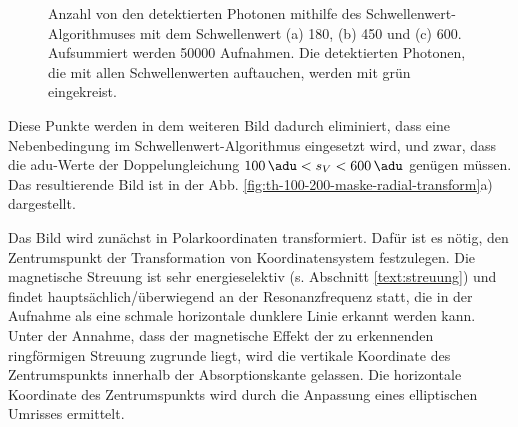 %     
\begin{figure}[H]
    \centering
    
    \caption{Anzahl von den detektierten Photonen mithilfe des Schwellenwert-Algorithmuses mit dem Schwellenwert (a) \SI{180}{\adu}, (b) \SI{450}{\adu} und (c) \SI{600}{\adu}. Aufsummiert werden \num{50000} Aufnahmen. Die detektierten Photonen, die mit allen Schwellenwerten auftauchen, werden mit grün eingekreist.}
    \label{fig:th_180_450_600}
\end{figure}
\noindent
Diese Punkte werden in dem weiteren Bild dadurch eliminiert, dass eine Nebenbedingung im Schwellenwert-Algorithmus eingesetzt wird, und zwar, dass die \gls{adu}-Werte der Doppelungleichung $\SI{100}{\adu} < s_V < \SI{600}{\adu}$ genügen müssen. Das resultierende Bild ist in der Abb. \ref{fig:th-100-200-maske-radial-transform}a) dargestellt.

\noindent
Das Bild wird zunächst in Polarkoordinaten transformiert. Dafür ist es nötig, den Zentrumspunkt der Transformation von Koordinatensystem festzulegen. Die magnetische Streuung ist sehr energieselektiv (s. Abschnitt \ref{text:streuung}) und findet hauptsächlich/überwiegend an der Resonanzfrequenz statt, die in der Aufnahme als eine schmale horizontale dunklere Linie erkannt werden kann. Unter der Annahme, dass der magnetische Effekt der zu erkennenden ringförmigen Streuung zugrunde liegt, wird die vertikale Koordinate des Zentrumspunkts innerhalb der Absorptionskante gelassen. Die horizontale Koordinate des Zentrumspunkts wird durch die Anpassung eines elliptischen Umrisses ermittelt.

